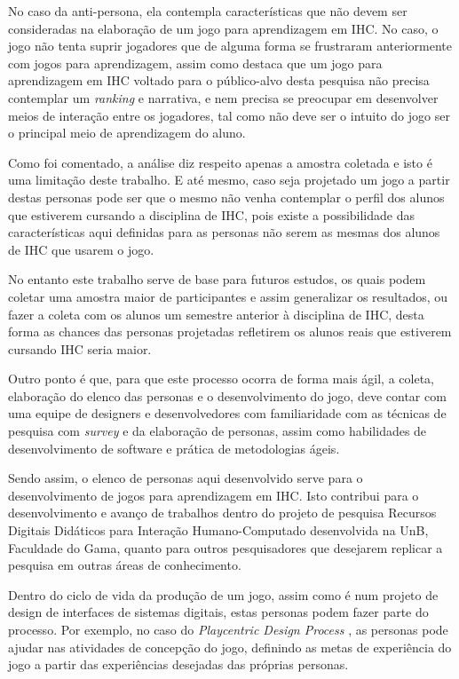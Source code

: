 No caso da anti-persona, ela contempla características que não devem ser consideradas na elaboração de um jogo para aprendizagem em IHC. No caso, o jogo não tenta suprir jogadores que de alguma forma se frustraram anteriormente com jogos para aprendizagem, assim como destaca que um jogo para aprendizagem em IHC voltado para o público-alvo desta pesquisa não precisa contemplar um \textit{ranking} e narrativa, e nem precisa se preocupar em desenvolver meios de interação entre os jogadores, tal como não deve ser o intuito do jogo ser o principal meio de aprendizagem do aluno.

Como foi comentado, a análise diz respeito apenas a amostra coletada e isto é uma limitação deste trabalho. E até mesmo, caso seja projetado um jogo a partir destas personas pode ser que o mesmo não venha contemplar o perfil dos alunos que estiverem cursando a disciplina de IHC, pois existe a possibilidade das características aqui definidas para as personas não serem as mesmas dos alunos de IHC que usarem o jogo.

No entanto este trabalho serve de base para futuros estudos, os quais podem coletar uma amostra maior de participantes e assim generalizar os resultados, ou fazer a coleta com os alunos um semestre anterior à disciplina de IHC, desta forma as chances das personas projetadas refletirem os alunos reais que estiverem cursando IHC seria maior.

Outro ponto é que, para que este processo ocorra de forma mais ágil, a coleta, elaboração do elenco das personas e o desenvolvimento do jogo, deve contar com uma equipe de designers e desenvolvedores com familiaridade com as técnicas de pesquisa com \textit{survey} e da elaboração de personas, assim como habilidades de desenvolvimento de software e prática de metodologias ágeis.

Sendo assim, o elenco de personas aqui desenvolvido serve para o desenvolvimento de jogos para aprendizagem em IHC. Isto contribui para o desenvolvimento e avanço de trabalhos dentro do projeto de pesquisa Recursos Digitais Didáticos para Interação Humano-Computado desenvolvida na UnB, Faculdade do Gama, quanto para outros pesquisadores que desejarem replicar a pesquisa em outras áreas de conhecimento.

Dentro do ciclo de vida da produção de um jogo, assim como é num projeto de design de interfaces de sistemas digitais, estas personas podem fazer parte do processo. Por exemplo, no caso do \textit{Playcentric Design Process} \cite{Fullerton_2008}, as personas pode ajudar nas atividades de concepção do jogo, definindo as metas de experiência do jogo a partir das experiências desejadas das próprias personas.

